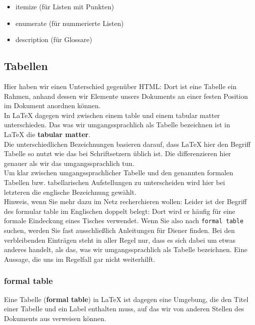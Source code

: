 \begin{itemize}
	\item itemize (für Listen mit Punkten)
	\item enumerate (für nummerierte Listen)
	\item description (für Glossare)
\end{itemize}

\subsection{Tabellen}

Hier haben wir einen Unterschied gegenüber HTML: Dort ist eine Tabelle ein Rahmen, anhand dessen wir Elemente unsers Dokuments an einer festen Position im Dokument anordnen können. \\

In LaTeX dagegen wird zwischen einem table und einem tabular matter unterschieden. Das was wir umgangssprachlich als Tabelle bezeichnen ist in LaTeX die \textbf{tabular matter}.\\

Die unterschiedlichen Bezeichnungen basieren darauf, dass LaTeX hier den Begriff Tabelle so nutzt wie das bei Schriftsetzern üblich ist. Die differenzieren hier genauer als wir das umgangssprachlich tun.\\

Um klar zwischen umgangssprachlicher Tabelle und den genannten formalen Tabellen bzw. tabellarischen Aufstellungen zu unterscheiden wird hier bei letzteren die englische Bezeichnung gewählt.\\

Hinweis, wenn Sie mehr dazu im Netz recherchieren wollen: Leider ist der Begriff des formular table im Englischen doppelt belegt: Dort wird er häufig für eine formale Eindeckung eines Tisches verwendet. Wenn Sie also nach \verb|formal table| suchen, werden Sie fast ausschließlich Anleitungen für Diener finden. Bei den verbleibenden Einträgen steht in aller Regel nur, dass es sich dabei um etwas anderes handelt, als das, was wir umgangssprachlich als Tabelle bezeichnen. Eine Aussage, die uns im Regelfall gar nicht weiterhilft.

\subsubsection{formal table}

Eine Tabelle (\textbf{formal table}) in LaTeX ist dagegen eine Umgebung, die den Titel einer Tabelle und ein Label enthalten muss, auf das wir von anderen Stellen des Dokuments aus verweisen können.\\


